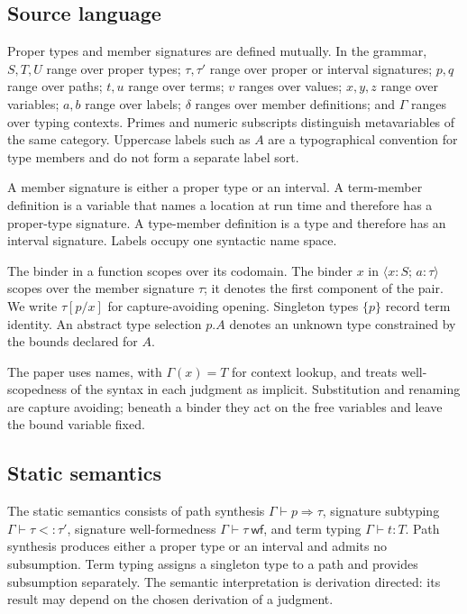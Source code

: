 \documentclass[acmsmall,screen,nonacm]{acmart}
\newcommand{\sing}[1]{\{#1\}}
\newcommand{\pairty}[4]{\langle #1\!:\!#2;\,#3\!:\!#4\rangle}
\newcommand{\subst}[3]{#1[#2/#3]}
\newcommand{\wf}{\mathrel{\mathsf{wf}}}
\begin{document}
\subsection{Source language}
\label{sec:syntax}

Proper types and member signatures are defined mutually. In the grammar,
\(S,T,U\) range over proper types; \(\tau,\tau'\) range over proper
or interval signatures; \(p,q\) range over paths; \(t,u\) range over
terms; \(v\) ranges over values; \(x,y,z\) range over variables; \(a,b\)
range over labels; \(\delta\) ranges over member definitions; and \(\Gamma\)
ranges over typing contexts. Primes and numeric subscripts distinguish
metavariables of the same category. Uppercase labels such as \(A\) are a
typographical convention for type members and do not form a separate label
sort.

A member signature is either a proper type or an interval. A term-member
definition is a variable that names a location at run time and therefore has
a proper-type signature. A type-member definition is a type and therefore
has an interval signature.
Labels occupy one syntactic name space.

The binder in a function scopes over its codomain. The binder \(x\) in
\(\pairty{x}{S}{a}{\tau}\) scopes over the member signature \(\tau\); it
denotes the first component of the pair. We write
\(\subst{\tau}{p}{x}\) for capture-avoiding opening. Singleton types
\(\sing{p}\) record term identity. An abstract type selection \(p.A\) denotes an
unknown type constrained by the bounds declared for \(A\).

The paper uses names, with \(\Gamma(x)=T\) for context lookup, and treats
well-scopedness of the syntax in each judgment as implicit. Substitution and
renaming are capture avoiding; beneath a binder they act on the free variables
and leave the bound variable fixed.

\subsection{Static semantics}
\label{sec:static-semantics}

The static semantics consists of path synthesis
\(\Gamma\vdash p\Rightarrow\tau\), signature subtyping
\(\Gamma\vdash\tau<:\tau'\), signature well-formedness
\(\Gamma\vdash\tau\ \wf\), and term typing \(\Gamma\vdash t:T\). Path
synthesis produces either a proper type or an interval and admits no
subsumption. Term typing assigns a singleton type to a path and provides
subsumption separately. The semantic interpretation is derivation directed:
its result may depend on the chosen derivation of a judgment.
\end{document}
